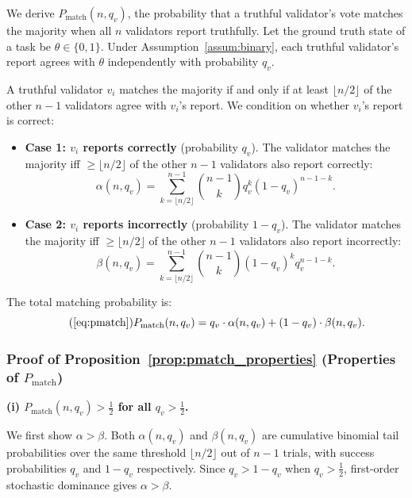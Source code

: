 We derive $P_{\text{match}}(n, q_v)$, the probability that a truthful validator's vote matches the majority when all $n$ validators report truthfully. Let the ground truth state of a task be $\theta \in \{0, 1\}$. Under Assumption~\ref{assum:binary}, each truthful validator's report agrees with $\theta$ independently with probability $q_v$.

A truthful validator $v_i$ matches the majority if and only if at least $\lfloor n/2 \rfloor$ of the other $n-1$ validators agree with $v_i$'s report. We condition on whether $v_i$'s report is correct:

\begin{itemize}
    \item \textbf{Case 1: $v_i$ reports correctly} (probability $q_v$). The validator matches the majority iff $\geq \lfloor n/2 \rfloor$ of the other $n-1$ validators also report correctly:
    \[
    \alpha(n, q_v) = \sum_{k=\lfloor n/2 \rfloor}^{n-1} \binom{n-1}{k} q_v^k (1 - q_v)^{n-1-k}.
    \]

    \item \textbf{Case 2: $v_i$ reports incorrectly} (probability $1 - q_v$). The validator matches the majority iff $\geq \lfloor n/2 \rfloor$ of the other $n-1$ validators also report incorrectly:
    \[
    \beta(n, q_v) = \sum_{k=\lfloor n/2 \rfloor}^{n-1} \binom{n-1}{k} (1 - q_v)^k q_v^{n-1-k}.
    \]
\end{itemize}

The total matching probability is:
\begin{equation}
\tag{\ref{eq:pmatch}}
P_{\text{match}}(n, q_v) = q_v \cdot \alpha(n, q_v) + (1 - q_v) \cdot \beta(n, q_v).
\end{equation}


\subsubsection{Proof of Proposition~\ref{prop:pmatch_properties} (Properties of $P_{\text{match}}$)}
\label{app:pmatch_properties}

\textbf{(i) $P_{\text{match}}(n, q_v) > \frac{1}{2}$ for all $q_v > \frac{1}{2}$.}

We first show $\alpha > \beta$. Both $\alpha(n, q_v)$ and $\beta(n, q_v)$ are cumulative binomial tail probabilities over the same threshold $\lfloor n/2 \rfloor$ out of $n-1$ trials, with success probabilities $q_v$ and $1-q_v$ respectively. Since $q_v > 1 - q_v$ when $q_v > \frac{1}{2}$, first-order stochastic dominance gives $\alpha > \beta$.

